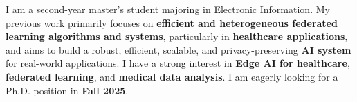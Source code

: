 

\begin{cvparagraph}


I am a second-year master's student majoring in Electronic Information.
My previous work primarily focuses on \textbf{efficient and heterogeneous federated learning algorithms and systems}, particularly in \textbf{healthcare applications},
and aims to build a robust, efficient, scalable, and privacy-preserving \textbf{AI system} for real-world applications.
I have a strong interest in \textbf{Edge AI for healthcare}, \textbf{federated learning}, and \textbf{medical data analysis}.
I am eagerly looking for a Ph.D. position in \textbf{Fall 2025}.


\end{cvparagraph}
